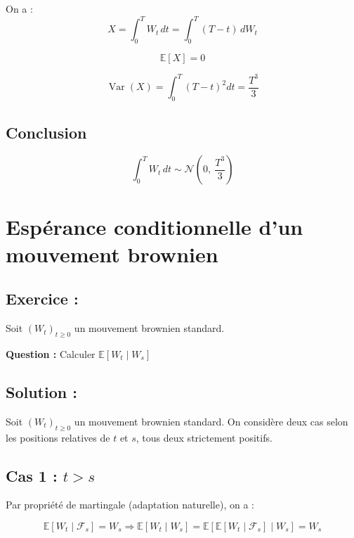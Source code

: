 On a :
\[
X = \int_0^T W_t \, dt = \int_0^T (T - t) \, dW_t
\]



\[
\mathbb{E}[X]  = 0
\]

\[
\operatorname{Var}(X) = \int_0^T (T-t)^2dt = \frac{T^3}{3}
\]



\subsection*{Conclusion}

\[
\boxed{
\int_0^T W_t \, dt \sim \mathcal{N}\left(0,\ \frac{T^3}{3} \right)
}
\]

\vspace{1cm}


\section{Espérance conditionnelle d'un mouvement brownien}

\subsection*{Exercice :}

\begin{exerciseBox}
Soit \( (W_t)_{t \geq 0} \) un mouvement brownien standard.

\vspace{1cm}

\textbf{Question :} Calculer \( \mathbb{E}[W_t \mid W_s] \)
\end{exerciseBox}

\subsection*{Solution :}

Soit \( (W_t)_{t \geq 0} \) un mouvement brownien standard. On considère deux cas selon les positions relatives de \( t \) et \( s \), tous deux strictement positifs.

\subsection*{Cas 1 : \( t > s \)}

Par propriété de martingale (adaptation naturelle), on a :

\[
\mathbb{E}[W_t \mid \mathcal{F}_s] = W_s
\Rightarrow
\mathbb{E}[W_t \mid W_s] = \mathbb{E}\left[\mathbb{E}[W_t \mid \mathcal{F}_s] \mid W_s\right] = W_s
\]

